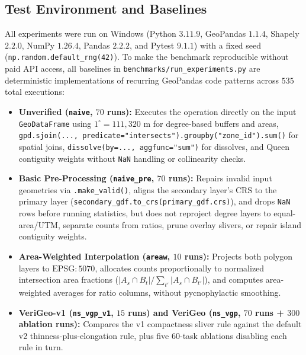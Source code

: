 \documentclass[10pt,twocolumn]{article}
\begin{document}
\subsection{Test Environment and Baselines}
All experiments were run on Windows (Python $3.11.9$, GeoPandas $1.1.4$, Shapely $2.2.0$, NumPy $1.26.4$, Pandas $2.2.2$, and Pytest $9.1.1$) with a fixed seed (\texttt{np.random.\allowbreak default\_rng(42)}). To make the benchmark reproducible without paid API access, all baselines in \texttt{benchmarks/\allowbreak run\_experiments.py} are deterministic implementations of recurring GeoPandas code patterns across $535$ total executions:
\begin{itemize}
  \item \textbf{Unverified (\texttt{naive}, $70$ runs):} Executes the operation directly on the input \texttt{GeoDataFrame} using $1^\circ = 111,320\text{ m}$ for degree-based buffers and areas, \texttt{gpd.sjoin(..., predicate=\allowbreak "intersects").\allowbreak groupby("zone\_id").sum()} for spatial joins, \texttt{dissolve(by=..., aggfunc="sum")} for dissolves, and Queen contiguity weights without \texttt{NaN} handling or collinearity checks.
  \item \textbf{Basic Pre-Processing (\texttt{naive\_pre}, $70$ runs):} Repairs invalid input geometries via \texttt{.make\_valid()}, aligns the secondary layer's CRS to the primary layer (\texttt{secondary\_gdf.\allowbreak to\_crs(primary\_gdf.crs)}), and drops \texttt{NaN} rows before running statistics, but does not reproject degree layers to equal-area/UTM, separate counts from ratios, prune overlay slivers, or repair island contiguity weights.
  \item \textbf{Area-Weighted Interpolation (\texttt{areaw}, $10$ runs):} Projects both polygon layers to $\text{EPSG}:5070$, allocates counts proportionally to normalized intersection area fractions ($|A_s \cap B_t| / \sum_{t'} |A_s \cap B_{t'}|$), and computes area-weighted averages for ratio columns, without pycnophylactic smoothing.
  \item \textbf{VeriGeo-v1 (\texttt{ns\_vgp\_v1}, $15$ runs) and VeriGeo (\texttt{ns\_vgp}, $70$ runs + $300$ ablation runs):} Compares the v1 compactness sliver rule against the default v2 thinness-plus-elongation rule, plus five 60-task ablations disabling each rule in turn.
\end{itemize}
\end{document}
